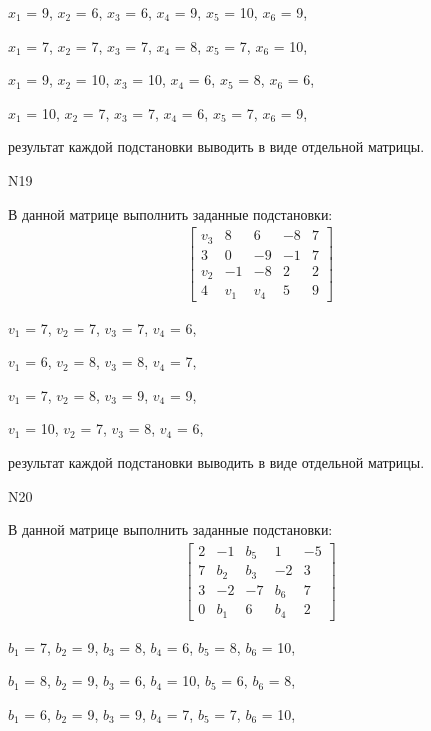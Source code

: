 \documentclass[11pt]{report}
\begin{document}
$x_{1}$ = 9, $x_{2}$ = 6, $x_{3}$ = 6, $x_{4}$ = 9, $x_{5}$ = 10, $x_{6}$ = 9, 

$x_{1}$ = 7, $x_{2}$ = 7, $x_{3}$ = 7, $x_{4}$ = 8, $x_{5}$ = 7, $x_{6}$ = 10, 

$x_{1}$ = 9, $x_{2}$ = 10, $x_{3}$ = 10, $x_{4}$ = 6, $x_{5}$ = 8, $x_{6}$ = 6, 

$x_{1}$ = 10, $x_{2}$ = 7, $x_{3}$ = 7, $x_{4}$ = 6, $x_{5}$ = 7, $x_{6}$ = 9, 

результат каждой подстановки выводить в виде отдельной матрицы.

N19

В данной матрице выполнить заданные подстановки:
\begin{align*}
\left[\begin{matrix}v_{3} & 8 & 6 & -8 & 7\\3 & 0 & -9 & -1 & 7\\v_{2} & -1 & -8 & 2 & 2\\4 & v_{1} & v_{4} & 5 & 9\end{matrix}\right]
\end{align*}


$v_{1}$ = 7, $v_{2}$ = 7, $v_{3}$ = 7, $v_{4}$ = 6, 

$v_{1}$ = 6, $v_{2}$ = 8, $v_{3}$ = 8, $v_{4}$ = 7, 

$v_{1}$ = 7, $v_{2}$ = 8, $v_{3}$ = 9, $v_{4}$ = 9, 

$v_{1}$ = 10, $v_{2}$ = 7, $v_{3}$ = 8, $v_{4}$ = 6, 

результат каждой подстановки выводить в виде отдельной матрицы.

N20

В данной матрице выполнить заданные подстановки:
\begin{align*}
\left[\begin{matrix}2 & -1 & b_{5} & 1 & -5\\7 & b_{2} & b_{3} & -2 & 3\\3 & -2 & -7 & b_{6} & 7\\0 & b_{1} & 6 & b_{4} & 2\end{matrix}\right]
\end{align*}


$b_{1}$ = 7, $b_{2}$ = 9, $b_{3}$ = 8, $b_{4}$ = 6, $b_{5}$ = 8, $b_{6}$ = 10, 

$b_{1}$ = 8, $b_{2}$ = 9, $b_{3}$ = 6, $b_{4}$ = 10, $b_{5}$ = 6, $b_{6}$ = 8, 

$b_{1}$ = 6, $b_{2}$ = 9, $b_{3}$ = 9, $b_{4}$ = 7, $b_{5}$ = 7, $b_{6}$ = 10, 
\end{document}
